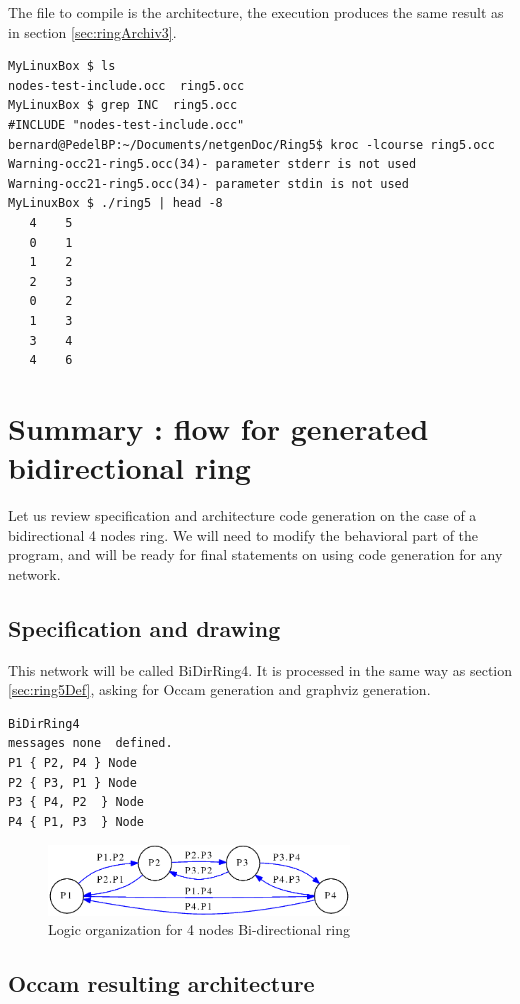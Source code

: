 \documentclass[times]{book}
\begin{document}
The file to compile is the architecture, the execution produces the same result as in section 
\ref{sec:ringArchiv3}.

\begin{lstlisting} 
MyLinuxBox $ ls
nodes-test-include.occ  ring5.occ
MyLinuxBox $ grep INC  ring5.occ
#INCLUDE "nodes-test-include.occ"
bernard@PedelBP:~/Documents/netgenDoc/Ring5$ kroc -lcourse ring5.occ
Warning-occ21-ring5.occ(34)- parameter stderr is not used
Warning-occ21-ring5.occ(34)- parameter stdin is not used
MyLinuxBox $ ./ring5 | head -8
   4    5
   0    1
   1    2
   2    3
   0    2
   1    3
   3    4
   4    6
\end{lstlisting} 

\section {Summary : flow for generated bidirectional ring }
Let us review specification and architecture code generation on the case of 
a bidirectional 4 nodes ring. We will need to modify  the behavioral part of the 
program, and will be ready for final statements on using  code generation
for any network.

\subsection {Specification and drawing }

This network will be called BiDirRing4. It is processed in the same way as section \ref{sec:ring5Def},
asking for Occam generation and graphviz generation.

\begin{lstlisting} 
BiDirRing4
messages none  defined. 
P1 { P2, P4 } Node
P2 { P3, P1 } Node 
P3 { P4, P2  } Node  
P4 { P1, P3  } Node  
\end{lstlisting} 


\begin{figure}[hbtp]
\begin{center} 
\includegraphics[width=8cm]{BiDirRing4.png}
\caption{Logic organization for 4 nodes Bi-directional ring}
\label{fig:BiDirRing4}
\end{center}
\end{figure}


\subsection {Occam resulting architecture}
\end{document}
